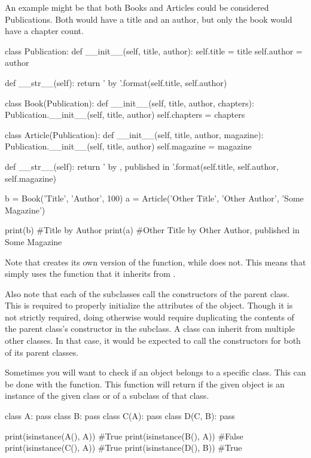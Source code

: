 \documentclass[11pt]{cselabheader}
\begin{document}
An example
might be that both Books and Articles could be considered Publications. Both
would have a title and an author, but only the book would have a chapter count.

\begin{python3code}
class Publication:
    def __init__(self, title, author):
        self.title = title
        self.author = author

    def __str__(self):
        return '{} by {}'.format(self.title, self.author)

class Book(Publication):
    def __init__(self, title, author, chapters):
        Publication.__init__(self, title, author)
        self.chapters = chapters

class Article(Publication):
    def __init__(self, title, author, magazine):
        Publication.__init__(self, title, author)
        self.magazine = magazine

    def __str__(self):
        return '{} by {}, published in {}'.format(self.title, self.author,
            self.magazine)

b = Book('Title', 'Author', 100)
a = Article('Other Title', 'Other Author', 'Some Magazine')

print(b) #Title by Author
print(a) #Other Title by Other Author, published in Some Magazine
\end{python3code}

Note that  creates its own version of the
 function, while  does not. This means
that  simply uses the function that it inherits from
.

Also note that each of the subclasses call the constructors of the parent class.
This is required to properly initialize the attributes of the object. Though it
is not strictly required, doing otherwise would require duplicating the
contents of the parent class's constructor in the subclass. A class can inherit
from multiple other classes. In that case, it would be expected to call the
constructors for both of its parent classes.

Sometimes you will want to check if an object belongs to a specific class. This
can be done with the  function. This function will
return  if the given object is an instance of the given class
or of a subclass of that class.

\begin{python3code}
class A:
    pass
class B:
    pass
class C(A):
    pass
class D(C, B):
    pass

print(isinstance(A(), A)) #True
print(isinstance(B(), A)) #False
print(isinstance(C(), A)) #True
print(isinstance(D(), B)) #True
\end{python3code}
\end{document}
